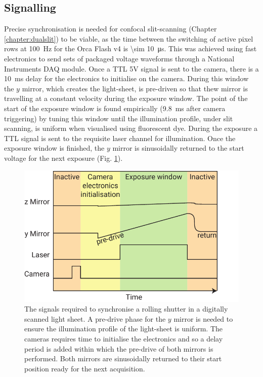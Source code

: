 
\subsection{Signalling} %

Precise synchronisation is needed for confocal slit-scanning (Chapter \ref{chapter:dualslit}) to be viable, as the time between the switching of active pixel rows at \SI{100}{\hertz} for the Orca Flash v4 is \SI{\sim 10}{\micro\second}. %
This was achieved using fast electronics to send sets of packaged voltage waveforms through a National Instruments DAQ module.
Once a TTL 5V signal is sent to the camera, there is a \SI{10}{\milli\second} delay for the electronics to initialise on the camera.
During this window the $y$ mirror, which creates the light-sheet, is pre-driven so that thew mirror is travelling at a constant velocity during the exposure window.
The point of the start of the exposure window is found empirically (\SI{9.8}{\milli\second} after camera triggering) by tuning this window until the illumination profile, under slit scanning, is uniform when visualised using fluorescent dye.
During the exposure a TTL signal is sent to the requisite laser channel for illumination.
Once the exposure window is finished, the $y$ mirror is sinusoidally returned to the start voltage for the next exposure (Fig. \ref{fig:slit_signals}).

\begin{figure}
  \centering
  \includegraphics{slit_signals}
  \caption{The signals required to synchronise a rolling shutter in a digitally scanned light sheet.
  A pre-drive phase for the $y$ mirror is needed to ensure the illumination profile of the light-sheet is uniform.
  The cameras requires time to initialise the electronics and so a delay period is added within which the pre-drive of both mirrors is performed.
  Both mirrors are sinusoidally returned to their start position ready for the next acquisition.
  }
  \label{fig:slit_signals}
\end{figure}

